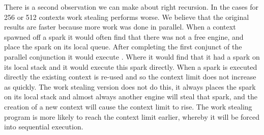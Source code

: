 There is a second observation we can make about right recursion.
In the cases for 256 or 512 contexts work stealing performs worse.
We believe that the original results are faster because more work was done
in parallel.
When a context spawned off a spark it would often find that there was not a
free engine, and place the spark on its local queue.
After completing the first conjunct of the parallel conjunction it would
execute \joinandcontinue.
Where it would find that it had a spark on its local stack and it would
execute this spark directly.
When a spark is executed directly the existing context is re-used and so the
context limit does not increase as quickly.
The work stealing version does not do this,
it always places the spark on its local stack and almost always
another engine will steal that spark,
and the creation of a new context will cause the context limit to rise.
The work stealing program is more likely to reach the context limit earlier,
whereby it will be forced into sequential execution.

